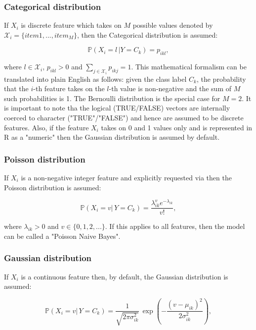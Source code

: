 \documentclass{article}\usepackage[]{graphicx}\usepackage[]{color}
\begin{document}
\subsubsection{Categorical distribution}

If $X_i$ is discrete feature which takes on $M$ possible values denoted by $\mathcal{X}_i = \{item1, ..., item_M\}$, then the Categorical distribution is assumed:

    \begin{equation}
     \mathbb{P}(X_i = l \, | Y = C_k) = p_{ikl},
    \end{equation}

where $l \in \mathcal{X}_i$,  $p_{ikl} > 0$ and $\sum_{j \in\mathcal{X}_i} p_{ikj} = 1$. This mathematical formalism can be translated into plain English as follows: given the class label $C_k$, the probability that the $i$-th feature takes on the $l$-th value is non-negative and the sum of $M$ such probabilities is 1. The Bernoulli distribution is the special case for $M=2$. It is important to note tha the logical (TRUE/FALSE) vectors are internally coerced to character ("TRUE"/"FALSE") and hence are assumed to be discrete features. Also, if the feature $X_i$ takes on 0 and 1 values only and is represented in R as a "numeric" then the Gaussian distribution is assumed by default.

\subsubsection{Poisson distribution}

If $X_i$ is a non-negative integer feature and explicitly requested via \textcolor{darkgreen}{{}} then the Poisson distribution is assumed:

$$\mathbb{P}(X_i=v | \, Y = C_k) = \frac{\lambda_{ik}^v e^{-\lambda_{ik}}}{v!},$$

where $\lambda_{ik} > 0$ and $v \in \{0,1,2,...\}$. If this applies to all features, then the model can be called a "Poisson Naive Bayes".


\subsubsection{Gaussian distribution}

If $X_i$ is a continuous feature then, by default, the Gaussian distribution is assumed:

$$\mathbb{P}(X_i = v | \, Y = C_k) = \frac{1}{\sqrt{2 \pi \sigma^2_{ik}}} \, \exp \left(- \frac{(v - \mu_{ik})^2}{2 \sigma^2_{ik}}\right),$$
\end{document}
